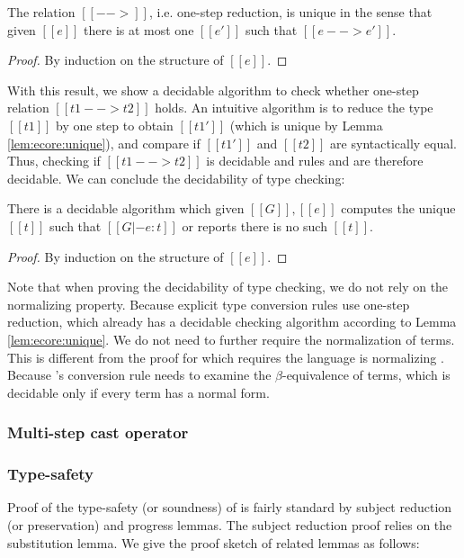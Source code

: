\begin{lem}\label{lem:ecore:unique}
	The relation $[[-->]]$, i.e. one-step reduction, is unique in the sense that given $[[e]]$ there is at most one $[[e']]$ such that $[[e --> e']]$.
\end{lem}

\begin{proof}
	By induction on the structure of $[[e]]$.
\end{proof}

With this result, we show a decidable algorithm to check whether one-step relation $[[t1 --> t2]]$ holds. An intuitive algorithm is to reduce the type $[[t1]]$ by one step to obtain $[[t1']]$ (which is unique by Lemma \ref{lem:ecore:unique}), and compare if $[[t1']]$ and $[[t2]]$ are syntactically equal. Thus, checking if $[[t1 --> t2]]$ is decidable and rules  and  are therefore decidable. We can conclude the decidability of type checking:

\begin{lem}\label{lem:ecore:decide}
	There is a decidable algorithm which given $[[G]], [[e]]$ computes the unique $[[t]]$ such that $[[G |- e:t]]$ or reports there is no such $[[t]]$.
\end{lem}

\begin{proof}
	By induction on the structure of $[[e]]$.
\end{proof}

Note that when proving the decidability of type checking, we do not rely on the normalizing property. Because explicit type conversion rules use one-step reduction, which already has a decidable checking algorithm according to Lemma \ref{lem:ecore:unique}. We do not need to further require the normalization of terms. This is different from the proof for \cc which requires the language is normalizing . Because \cc's conversion rule needs to examine the $\beta$-equivalence of terms, which is decidable only if every term has a normal form.

\subsubsection{Multi-step cast operator}

\subsubsection{Type-safety}
Proof of the type-safety (or soundness) of \ecore is fairly standard by subject reduction (or preservation) and progress lemmas. The subject reduction proof relies on the substitution lemma. We give the proof sketch of related lemmas as follows:

